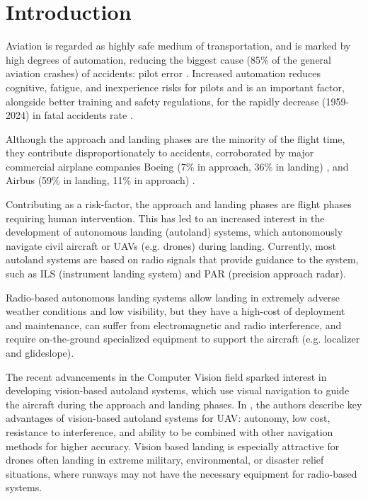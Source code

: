 \chapter{Introduction}\label{ch:introduction}
Aviation is regarded as highly safe medium of transportation, and is marked by high degrees of automation, reducing the biggest cause (85\% of the general aviation crashes) of accidents: pilot error \cite{li_factors_2001}. Increased automation reduces cognitive, fatigue, and inexperience risks for pilots and is an important factor, alongside better training and safety regulations, for the rapidly decrease (1959-2024) in fatal accidents rate \cite{airbus_fatal_nodate}.

Although the approach and landing phases are the minority of the flight time, they contribute disproportionately to accidents, corroborated by major commercial airplane companies Boeing (7\% in approach, 36\% in landing) \cite{boeing_statistical_2024}, and Airbus (59\% in landing, 11\% in approach) \cite{airbus_accidents_nodate}.

Contributing as a risk-factor, the approach and landing phases are flight phases requiring human intervention. This has led to an increased interest in the development of autonomous landing (autoland) systems, which autonomously navigate civil aircraft or UAVs (e.g. drones) during landing. Currently, most autoland systems are based on radio signals that provide guidance to the system, such as ILS (instrument landing system) and PAR (precision approach radar).

Radio-based autonomous landing systems allow landing in extremely adverse weather conditions and low visibility, but they have a high-cost of deployment and maintenance, can suffer from electromagnetic and radio interference, and require on-the-ground specialized equipment to support the aircraft (e.g. localizer and glideslope).

The recent advancements in the Computer Vision field sparked interest \cite{airbus_airbus_2021} in developing vision-based autoland systems, which use visual navigation to guide the aircraft during the approach and landing phases. In \cite{xin_vision-based_2022}, the authors describe key advantages of vision-based autoland systems for UAV: autonomy, low cost, resistance to interference, and ability to be combined with other navigation methods for higher accuracy. Vision based landing is especially attractive for drones often landing in extreme military, environmental, or disaster relief situations, where runways may not have the necessary equipment for radio-based systems.

